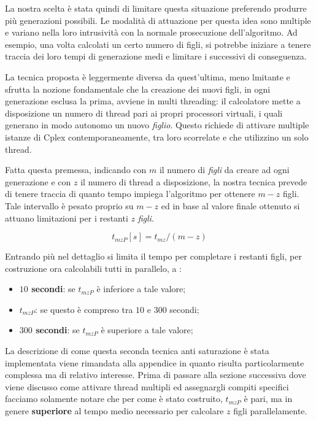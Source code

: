 \documentclass[11pt]{article}
\begin{document}
La nostra scelta è stata quindi di limitare questa situazione preferendo produrre più generazioni possibili. Le modalità di attuazione per questa idea sono multiple e variano nella loro intrusività con la normale prosecuzione dell'algoritmo. Ad esempio, una volta calcolati un certo numero di figli, si potrebbe iniziare a tenere traccia dei loro tempi di generazione medi e limitare i successivi di conseguenza.

La tecnica proposta è leggermente diversa da quest'ultima, meno lmitante e sfrutta la nozione fondamentale che la creazione dei nuovi figli, in ogni generazione esclusa la prima, avviene in multi threading: il calcolatore mette a disposizione un numero di thread pari ai propri processori virtuali, i quali generano in modo autonomo un nuovo \textit{figlio}. Questo richiede di attivare multiple istanze di Cplex contemporaneamente, tra loro scorrelate e che utilizzino un solo thread.

Fatta questa premessa, indicando con $m$ il numero di \textit{figli} da creare ad ogni generazione e con $z$ il numero di thread a disposizione, la nostra tecnica prevede di tenere traccia di quanto tempo impiega l'algoritmo per ottenere $m-z$ figli. Tale intervallo è pesato proprio su $m-z$ ed in base al valore finale ottenuto si attuano limitazioni per i restanti $z$ \textit{figli}.

\begin{equation}\label{eq:tMZ}
\displaystyle t_{mzP}[s] = t_{mz}/(m-z)
\end{equation}

Entrando più nel dettaglio si limita il tempo per completare i restanti figli, per costruzione ora calcolabili tutti in parallelo, a :

\begin{itemize}
    \item \textbf{$10$ secondi}: se $t_{mzP}$ è inferiore a tale valore;
    \item \textbf{$t_{mzP}$}: se questo è compreso tra $10$ e $300$ secondi;
    \item \textbf{$300$ secondi}: se  $t_{mzP}$ è superiore a tale valore;
\end{itemize}

La descrizione di come questa seconda tecnica anti saturazione è stata implementata viene rimandata alla appendice in quanto risulta particolarmente complessa ma di relativo interesse. Prima di passare alla sezione successiva dove viene discusso come attivare thread multipli ed assegnargli compiti specifici facciamo solamente notare che per come è stato costruito, $t_{mzP}$ è pari, ma in genere \textbf{superiore} al tempo medio necessario per calcolare $z$ figli parallelamente.
\end{document}
